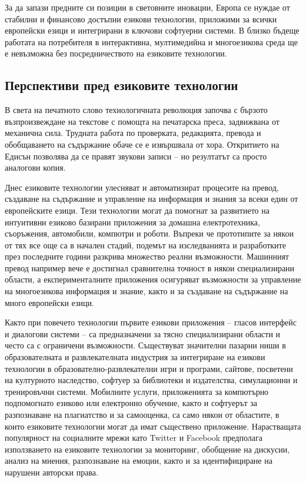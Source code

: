 \begin{multicols}{2}
  За да запази предните си позиции в световните иновации, Европа се нуждае от стабилни и финансово достъпни езикови технологии, приложими за всички европейски езици и интегрирани в ключови софтуерни системи.
  В близко бъдеще работата на потребителя в интерактивна, мултимедийна и многоезикова  среда ще е  невъзможна
  без посредничеството на езиковите технологии.

  \subsection{Перспективи пред езиковите технологии}

  В света на печатното слово технологичната революция започва с бързото възпроизвеждане на текстове с помощта на печатарска преса, задвижвана от механична сила. Трудната работа по проверката, редакцията, превода и обобщаването на съдържание обаче се е извършвала от хора. Откритието на Едисън позволява да се правят звукови записи – но резултатът са просто аналогови копия.

  Днес езиковите технологии улесняват и автоматизират процесите на превод, създаване на съдържание и управление на информация и знания за всеки един от европейските езици. Тези технологии могат да помогнат за развитието на интуитивни
   езиково базирани приложения за домашна електротехника, съоръжения, автомобили, компютри и роботи. Въпреки че прототипите
   за някои от тях все още са в начален стадий, подемът на изследванията и разработките през последните години разкрива множество реални възможности. Машинният превод например вече е достигнал сравнителна точност в някои специализирани области, а
   експерименталните приложения осигуряват възможности за управление на
   многоезикова информация и знание, както и за
   създаване на съдържание на много европейски езици.


  Както при повечето технологии първите езикови приложения -- гласов
   интерфейс и диалогови системи -- са предназначени за тясно специализирани области и често са с ограничени възможности. 
   Съществуват значителни пазарни ниши в образователната и развлекателната индустрия за интегриране на езикови технологии в образователно-развлекателни игри и програми, сайтове, посветени на културното наследство, софтуер за библиотеки и издателства, симулационни и тренировъчни системи.
  Мобилните услуги, приложенията за компютърно подпомогнато езиково или електронно обучение, както и софтуерът за разпознаване
  на плагиатство и за самооценка, са само някои от областите, в които езиковите технологии могат да имат съществено приложение. Нарастващата популярност на социалните мрежи като Twitter и Facebook предполага използването на езиковите технологии за мониторинг, обобщение на дискусии, анализ на мнения, разпознаване на емоции, както и за идентифициране на нарушени авторски права.


\end{multicols}
